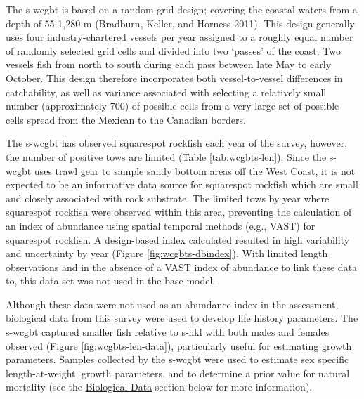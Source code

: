 \documentclass[11pt,
  english,
  a4paper,
]{article}
\begin{document}

The \gls{s-wcgbt} is based on a random-grid design; covering the coastal waters from a depth of 55-1,280 m {(Bradburn, Keller, and Horness 2011)\leavevmode\tagmcend\tagstructend}. This design generally uses four industry-chartered vessels per year assigned to a roughly equal number of randomly selected grid cells and divided into two `passes' of the coast. Two vessels fish from north to south during each pass between late May to early October. This design therefore incorporates both vessel-to-vessel differences in catchability, as well as variance associated with selecting a relatively small number (approximately 700) of possible cells from a very large set of possible cells spread from the Mexican to the Canadian borders.

\leavevmode\tagmcend\tagstructend\par


The \gls{s-wcgbt} has observed squarespot rockfish each year of the survey, however, the number of positive tows are limited (Table \ref{tab:wcgbts-len}). Since the \Gls{s-wcgbt} uses trawl gear to sample sandy bottom areas off the West Coast, it is not expected to be an informative data source for squarespot rockfish which are small and closely associated with rock substrate. The limited tows by year where squarespot rockfish were observed within this area, preventing the calculation of an index of abundance using spatial temporal methods (e.g., VAST) for squarespot rockfish. A design-based index calculated resulted in high variability and uncertainty by year (Figure \ref{fig:wcgbts-dbindex}). With limited length observations and in the absence of a VAST index of abundance to link these data to, this data set was not used in the base model.

\leavevmode\tagmcend\tagstructend\par


Although these data were not used as an abundance index in the assessment, biological data from this survey were used to develop life history parameters. The \gls{s-wcgbt} captured smaller fish relative to \gls{s-hkl} with both males and females observed (Figure \ref{fig:wcgbts-len-data}), particularly useful for estimating growth parameters. Samples collected by the \gls{s-wcgbt} were used to estimate sex specific length-at-weight, growth parameters, and to determine a prior value for natural mortality (see the {\protect\hyperlink{biological_data}{Biological Data}\leavevmode\tagmcend\tagstructend} section below for more information).
\end{document}
